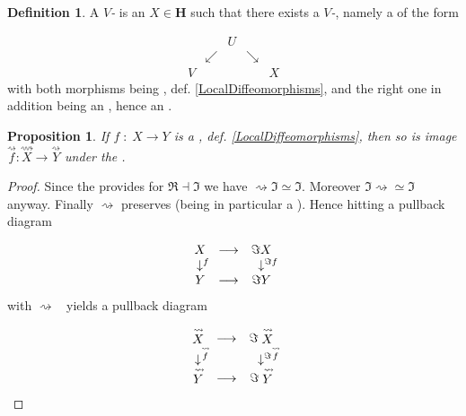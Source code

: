 \documentclass[12pt,titlepage]{article}
\def\mathrlap{\mathpalette\mathrlapinternal}
\def\mathrlapinternal#1#2{\rlap{$\mathsurround=0pt#1{#2}$}}
\newcommand{\itexarray}[1]{\begin{matrix}#1\end{matrix}}
\theoremstyle{plain}
\newtheorem{prop}{Proposition}
\theoremstyle{definition}
\newtheorem{defn}{Definition}
\theoremstyle{remark}
\begin{document}
\begin{defn}
\label{VManifold}\hypertarget{VManifold}{}
A \emph{$V$-} is an $X \in \mathbf{H}$ such that there exists a \emph{$V$-}, namely a  of the form

\begin{displaymath}
\itexarray{
    && U
    \\
    & \swarrow && \searrow
    \\
    V && && X
  }
\end{displaymath}
with both morphisms being , def. \ref{LocalDiffeomorphisms}, and the right one in addition being an , hence an .

\end{defn}
\begin{prop}
\label{}\hypertarget{}{}
If $f \;\colon\; X \longrightarrow Y$ is a , def. \ref{LocalDiffeomorphisms}, then so is image $\stackrel{\rightsquigarrow}{f}\colon \stackrel{\rightsquigarrow}{X} \longrightarrow \stackrel{\rightsquigarrow}{Y}$ under the .

\end{prop}
\begin{proof}
Since the  provides  for $\Re\dashv \Im$ we have $\rightsquigarrow \Im \simeq \Im$. Moreover $\Im \rightsquigarrow \simeq \Im$ anyway. Finally $\rightsquigarrow$ preserves  (being in particular a ). Hence hitting a pullback diagram

\begin{displaymath}
\itexarray{
    X &\longrightarrow& \Im X
    \\
    \downarrow^{\mathrlap{f}} && \downarrow^{\mathrlap{\Im f}}
    \\
    Y &\longrightarrow& \Im Y
  }
\end{displaymath}
with $\rightsquigarrow\;\;$ yields a pullback diagram

\begin{displaymath}
\itexarray{
    \stackrel{\rightsquigarrow}{X} &\longrightarrow& \Im \stackrel{\rightsquigarrow}{X}
    \\
    \downarrow^{\mathrlap{\stackrel{\rightsquigarrow}{f}}} && \downarrow^{\mathrlap{\Im \stackrel{\rightsquigarrow}{f}}}
    \\
    \stackrel{\rightsquigarrow}{Y} &\longrightarrow& \Im \stackrel{\rightsquigarrow}{Y}
  }
\end{displaymath}
\end{proof}
\end{document}
